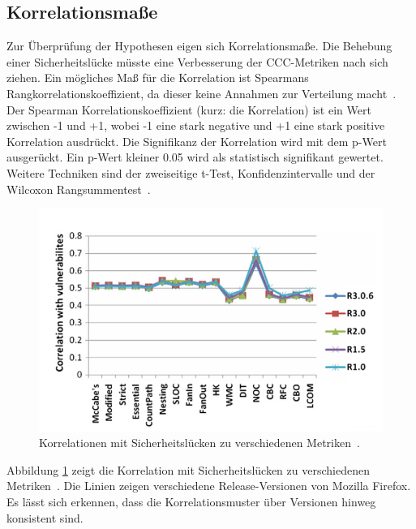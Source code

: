 \subsection{Korrelationsmaße}
Zur Überprüfung der Hypothesen eigen sich Korrelationsmaße.
Die Behebung einer Sicherheitslücke müsste eine Verbesserung der CCC-Metriken nach sich ziehen.
Ein mögliches Maß für die Korrelation ist Spearmans Rangkorrelationskoeffizient, da dieser keine Annahmen zur Verteilung macht~\cite{alves_et_al,chowdhury_zulkernine_2010}.
Der Spearman Korrelationskoeffizient (kurz: die Korrelation) ist ein Wert zwischen -1 und +1, wobei -1 eine stark negative und +1 eine stark positive Korrelation ausdrückt.
Die Signifikanz der Korrelation wird mit dem p-Wert ausgerückt.
Ein p-Wert kleiner 0.05 wird als statistisch signifikant gewertet.
Weitere Techniken sind der zweiseitige t-Test, Konfidenzintervalle und der Wilcoxon Rangsummentest~\cite{alves_et_al}.
\begin{figure}
	\includegraphics[width=\textwidth]{img/vulnerability_correlations.png}
	\caption{Korrelationen mit Sicherheitslücken zu verschiedenen Metriken~\cite{chowdhury_zulkernine_2009}.}
	\label{fig:correlations}
\end{figure}
Abbildung \ref{fig:correlations} zeigt die Korrelation mit Sicherheitslücken zu verschiedenen Metriken~\cite{chowdhury_zulkernine_2009}.
Die Linien zeigen verschiedene Release-Versionen von Mozilla Firefox.
Es lässt sich erkennen, dass die Korrelationsmuster über Versionen hinweg konsistent sind\cite{chowdhury_zulkernine_2009}.

